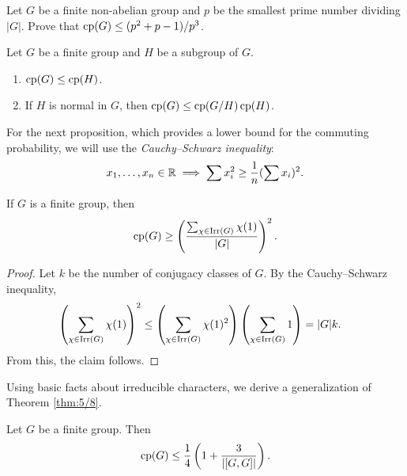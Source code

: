 \begin{exercise}
\label{xca:least_p}
    Let $G$ be a finite non-abelian group and $p$ be the smallest prime number
    dividing $|G|$. Prove that $\operatorname{cp}(G)\leq (p^2+p-1)/p^3$. 
\end{exercise}

\begin{bonus}
\label{xca:cp(G)}
    Let $G$ be a finite group and $H$ be a subgroup of $G$.
    \begin{enumerate}
        \item $\operatorname{cp}(G)\leq\operatorname{cp}(H)$.
        \item If $H$ is normal in $G$, then $\operatorname{cp}(G)\leq\operatorname{cp}(G/H)\operatorname{cp}(H)$.
    \end{enumerate}
\end{bonus}

For the next proposition, which provides a lower bound for the commuting probability, we will use
the \emph{Cauchy–Schwarz inequality}:
\[
x_1,\dots,x_n\in\mathbb{R}\implies
\sum x_i^2\geq\frac{1}{n}(\sum x_i)^2.
\]



\begin{proposition}
If $G$ is a finite group, then
\[
\operatorname{cp}(G)\geq\left(\frac{\sum_{\chi\in\operatorname{Irr}(G)}\chi(1)}{|G|}\right)^2.
\]
\end{proposition}

\begin{proof}
    Let $k$ be the number of conjugacy classes of $G$.
    By the Cauchy--Schwarz inequality, 
    \begin{align*}
        \left(\sum_{\chi\in\operatorname{Irr}(G)}\chi(1)\right)^2
        &\leq\left(\sum_{\chi\in\operatorname{Irr}(G)}\chi(1)^2\right)\left(\sum_{\chi\in\operatorname{Irr}(G)}1\right)
        =|G|k.
    \end{align*}
    From this, the claim follows.
\end{proof}

Using basic facts about irreducible characters, we derive a generalization of Theorem \ref{thm:5/8}.

\begin{theorem}
\label{thm:[GG]}
    Let $G$ be a finite group. Then
    \[
        \operatorname{cp}(G)\leq\frac14\left(1+\frac3{|[G,G]|}\right).
    \]
\end{theorem}

